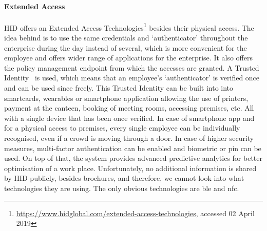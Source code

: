 \paragraph{Extended Access}
HID offers an Extended Access Technologies\footnote{\url{ https://www.hidglobal.com/extended-access-technologies}, accessed 02 April 2019} besides their physical access. The idea behind is to use the same credentials and ‘authenticator’ throughout the enterprise during the day instead of several, which is more convenient for the employee and offers wider range of applications for the enterprise. It also offers the policy management endpoint from which the accesses are granted. A Trusted Identity~\cite{2018ExperiencingPredictive} is used, which means that an employee’s ‘authenticator’ is verified once and can be used since freely. This Trusted Identity can be built into into smartcards, wearables or smartphone application allowing the use of printers, payment at the canteen, booking of meeting rooms, accessing premises, etc. All with a single device that has been once verified. In case of smartphone app and for a physical access to premises, every single employee can be individually recognised, even if a crowd is moving through a door. In case of higher security measures, multi-factor authentication can be enabled and biometric or \acrshort{pin} can be used. On top of that, the system provides advanced predictive analytics for better optimisation of a work place. Unfortunately, no additional information is shared by HID publicly, besides brochures, and therefore, we cannot look into what technologies they are using. The only obvious technologies are \acrshort{ble} and \acrshort{nfc}.